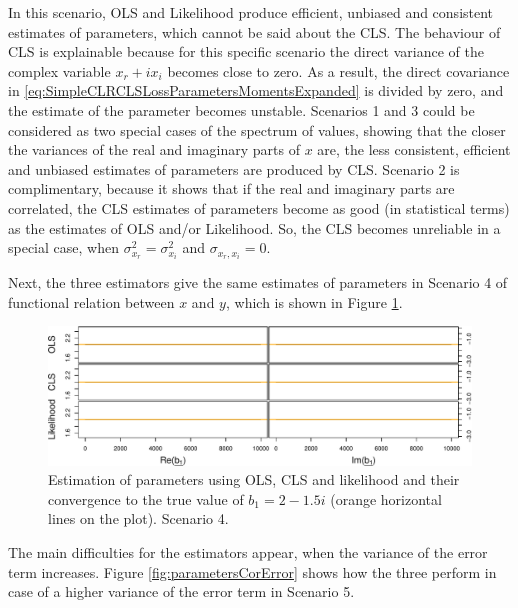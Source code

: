\documentclass[
]{book}
\begin{document}
In this scenario, OLS and Likelihood produce efficient, unbiased and consistent estimates of parameters, which cannot be said about the CLS. The behaviour of CLS is explainable because for this specific scenario the direct variance of the complex variable \(x_r + i x_i\) becomes close to zero. As a result, the direct covariance in \eqref{eq:SimpleCLRCLSLossParametersMomentsExpanded} is divided by zero, and the estimate of the parameter becomes unstable. Scenarios 1 and 3 could be considered as two special cases of the spectrum of values, showing that the closer the variances of the real and imaginary parts of \(x\) are, the less consistent, efficient and unbiased estimates of parameters are produced by CLS. Scenario 2 is complimentary, because it shows that if the real and imaginary parts are correlated, the CLS estimates of parameters become as good (in statistical terms) as the estimates of OLS and/or Likelihood. So, the CLS becomes unreliable in a special case, when \(\sigma_{x_r}^2 = \sigma_{x_i}^2\) and \(\sigma_{x_r,x_i}=0\).

Next, the three estimators give the same estimates of parameters in Scenario 4 of functional relation between \(x\) and \(y\), which is shown in Figure \ref{fig:parametersFR}.

\begin{figure}
\centering
\includegraphics{Svetunkov---Svetunkov---Complex-Dynamic-Models_files/figure-latex/parametersFR-1.pdf}
\caption{\label{fig:parametersFR}Estimation of parameters using OLS, CLS and likelihood and their convergence to the true value of \(b_1=2-1.5i\) (orange horizontal lines on the plot). Scenario 4.}
\end{figure}

The main difficulties for the estimators appear, when the variance of the error term increases. Figure \ref{fig:parametersCorError} shows how the three perform in case of a higher variance of the error term in Scenario 5.
\end{document}
